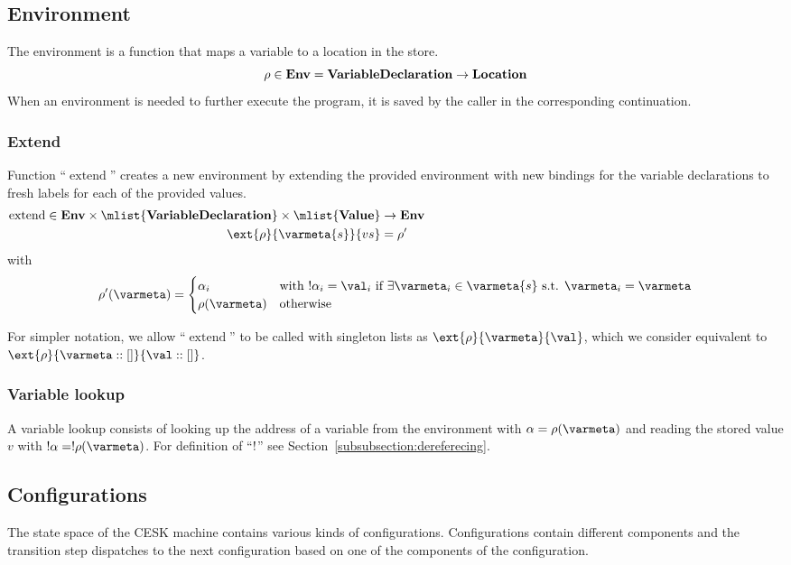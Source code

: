 \documentclass{article}
\DeclareMathOperator{\extend}{extend}
\begin{document}
\subsection{Environment}
\label{subsec:env-definition}
The environment is a function that maps a variable to a location in the store.
\[\rho \in \mathbf{Env} = \mathbf{VariableDeclaration} \rightarrow \mathbf{Location}\]
When an environment is needed to further execute the program, it is saved by the caller in the corresponding continuation.

\subsubsection{Extend}
\label{subsubsec:extend-env}

Function ``$\extend$'' creates a new environment by extending the provided environment with new bindings for the variable declarations to fresh labels for each of the provided values.
\begin{align*}
  \extend \in \denv \times \mlist{\dvardecl} \times \mlist{\dval} &\rightarrow  \denv \hspace{100mm} \\
  \ext{\env}{\varmeta{s}}{\vals} &= \env'
\end{align*}
with
\[
	\env'(\varmeta) =\begin{cases}
	\loc_i & \textrm{with }\deref{\loc_i} = \val_i\textrm{ if }\exists\varmeta_i \in \varmeta{s} \textrm{ s.t. } \varmeta_i = \varmeta\\
	\env(\varmeta) &\textrm{otherwise}
	\end{cases}
\]

For simpler notation, we allow ``$\extend$'' to be called with singleton lists as $\ext{\env}{\varmeta}{\val}$, which we consider equivalent to $\ext{\env}{\varmeta :: []}{\val :: []}$.
\subsubsection{Variable lookup}
\label{subsubsec:variable-lookup}
A variable lookup consists of looking up the address of a variable from the environment with $\loc = \env(\varmeta)$ and reading the stored value $v$ with $\deref{\loc} = \deref{\env(\varmeta)}$.
For definition of ``$!$'' see Section~\ref{subsubsection:dereferecing}.

\subsection{Configurations}
\label{subsec:cesk-configs}
The state space of the CESK machine contains various kinds of configurations.
Configurations contain different components and the transition step dispatches to the next configuration based on one of the components of the configuration.
\end{document}
